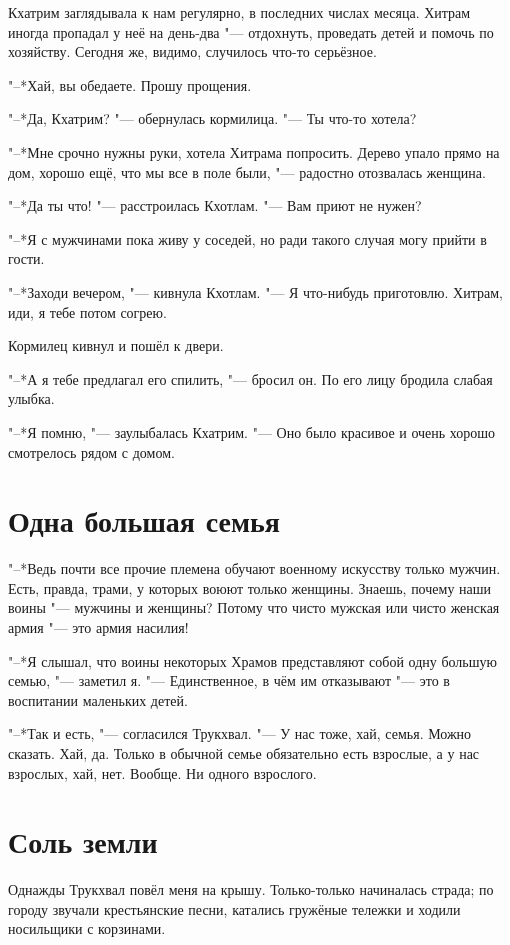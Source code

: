 Кхатрим заглядывала к нам регулярно, в последних числах месяца.
Хитрам иногда пропадал у неё на день-два "--- отдохнуть, проведать детей и помочь по хозяйству.
Сегодня же, видимо, случилось что-то серьёзное.

"--*Хай, вы обедаете.
Прошу прощения.

"--*Да, Кхатрим? "--- обернулась кормилица.
"--- Ты что-то хотела?

"--*Мне срочно нужны руки, хотела Хитрама попросить.
Дерево упало прямо на дом, хорошо ещё, что мы все в поле были, "--- радостно отозвалась женщина.

"--*Да ты что! "--- расстроилась Кхотлам.
"--- Вам приют не нужен?

"--*Я с мужчинами пока живу у соседей, но ради такого случая могу прийти в гости.

"--*Заходи вечером, "--- кивнула Кхотлам.
"--- Я что-нибудь приготовлю.
Хитрам, иди, я тебе потом согрею.

Кормилец кивнул и пошёл к двери.

"--*А я тебе предлагал его спилить, "--- бросил он.
По его лицу бродила слабая улыбка.

"--*Я помню, "--- заулыбалась Кхатрим.
"--- Оно было красивое и очень хорошо смотрелось рядом с домом.

\section{Одна большая семья}

"--*Ведь почти все прочие племена обучают военному искусству только мужчин.
Есть, правда, трами, у которых воюют только женщины.
Знаешь, почему наши воины "--- мужчины и женщины?
Потому что чисто мужская или чисто женская армия "--- это армия насилия!

"--*Я слышал, что воины некоторых Храмов представляют собой одну большую семью, "--- заметил я.
"--- Единственное, в чём им отказывают "--- это в воспитании маленьких детей.

"--*Так и есть, "--- согласился Трукхвал.
"--- У нас тоже, хай, семья.
Можно сказать.
Хай, да.
Только в обычной семье обязательно есть взрослые, а у нас взрослых, хай, нет.
Вообще.
Ни одного взрослого.

\section{Соль земли}

Однажды Трукхвал повёл меня на крышу.
Только-только начиналась страда;
по городу звучали крестьянские песни, катались гружёные тележки и ходили носильщики с корзинами.

